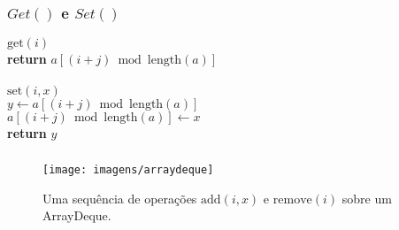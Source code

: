 \documentclass{beamer}
\begin{document}
\begin{frame}
\frametitle{$Get()$ e $Set()$}
\begin{oframed}
\begin{flushleft}
\hspace*{1em} $\ensuremath{\mathrm{get}(\ensuremath{\mathit{i}})}$\\

\hspace*{1em} \hspace*{1em} {\color{black} \textbf{return}} $\ensuremath{\ensuremath{\mathit{a}}[(\ensuremath{\mathit{i}}+\ensuremath{\mathit{j}})\bmod \mathrm{length}(\ensuremath{\mathit{a}})]}$\\
\ \\
\hspace*{1em} $\ensuremath{\mathrm{set}(\ensuremath{\mathit{i}}, \ensuremath{\mathit{x}})}$\\

\hspace*{1em} \hspace*{1em} $\ensuremath{\ensuremath{\mathit{y}} \gets  \ensuremath{\ensuremath{\mathit{a}}[(\ensuremath{\mathit{i}}+\ensuremath{\mathit{j}})\bmod \mathrm{length}(\ensuremath{\mathit{a}})]}}$\\
\hspace*{1em} \hspace*{1em} $\ensuremath{\ensuremath{\mathit{a}}[\ensuremath{(\ensuremath{\mathit{i}}+\ensuremath{\mathit{j}})\bmod \mathrm{length}(\ensuremath{\mathit{a}})}] \gets  \ensuremath{x}}$\\
\hspace*{1em} \hspace*{1em} {\color{black} \textbf{return}} $\ensuremath{\ensuremath{\mathit{y}}}$\\
\end{flushleft}
\end{oframed}
\end{frame}

\begin{frame}
\frametitle{}
\begin{figure}
  \begin{center}
    \texttt{[image: imagens/arraydeque]}
  \end{center}
  \caption[Adding and removing from an ArrayDeque]{Uma sequência de operações $\ensuremath{\ensuremath{\mathrm{add}(\ensuremath{\mathit{i}},\ensuremath{\mathit{x}})}}$ e $\ensuremath{\ensuremath{\mathrm{remove}(\ensuremath{\mathit{i}})}}$ sobre um
  ArrayDeque.}
\end{figure}
\end{frame}
\end{document}
